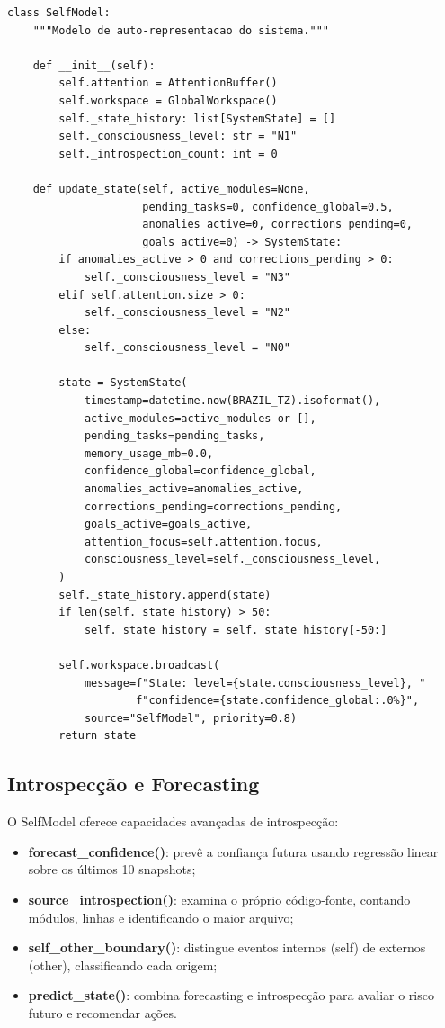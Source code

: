 \begin{lstlisting}[style=pythonstyle, caption={SelfModel: arquitetura N0-N3 (self\_model.py:180-250)}]
class SelfModel:
    """Modelo de auto-representacao do sistema."""

    def __init__(self):
        self.attention = AttentionBuffer()
        self.workspace = GlobalWorkspace()
        self._state_history: list[SystemState] = []
        self._consciousness_level: str = "N1"
        self._introspection_count: int = 0

    def update_state(self, active_modules=None,
                     pending_tasks=0, confidence_global=0.5,
                     anomalies_active=0, corrections_pending=0,
                     goals_active=0) -> SystemState:
        if anomalies_active > 0 and corrections_pending > 0:
            self._consciousness_level = "N3"
        elif self.attention.size > 0:
            self._consciousness_level = "N2"
        else:
            self._consciousness_level = "N0"

        state = SystemState(
            timestamp=datetime.now(BRAZIL_TZ).isoformat(),
            active_modules=active_modules or [],
            pending_tasks=pending_tasks,
            memory_usage_mb=0.0,
            confidence_global=confidence_global,
            anomalies_active=anomalies_active,
            corrections_pending=corrections_pending,
            goals_active=goals_active,
            attention_focus=self.attention.focus,
            consciousness_level=self._consciousness_level,
        )
        self._state_history.append(state)
        if len(self._state_history) > 50:
            self._state_history = self._state_history[-50:]

        self.workspace.broadcast(
            message=f"State: level={state.consciousness_level}, "
                    f"confidence={state.confidence_global:.0%}",
            source="SelfModel", priority=0.8)
        return state
\end{lstlisting}

\subsection{Introspecção e Forecasting}

O SelfModel oferece capacidades avançadas de introspecção:

\begin{itemize}
\item \textbf{forecast\_confidence()}: prevê a confiança futura usando
regressão linear sobre os últimos 10 snapshots;
\item \textbf{source\_introspection()}: examina o próprio código-fonte,
contando módulos, linhas e identificando o maior arquivo;
\item \textbf{self\_other\_boundary()}: distingue eventos internos
(self) de externos (other), classificando cada origem;
\item \textbf{predict\_state()}: combina forecasting e introspecção
para avaliar o risco futuro e recomendar ações.
\end{itemize}

